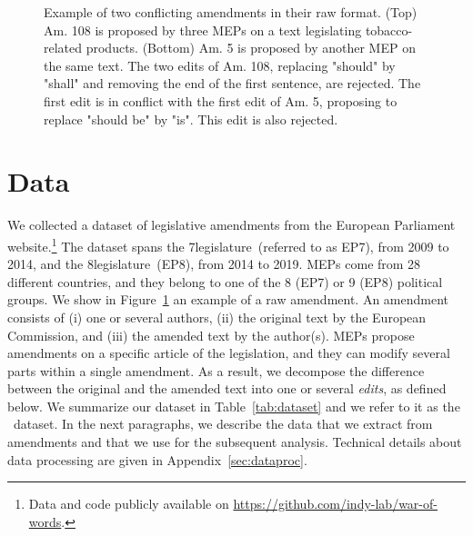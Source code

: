 \begin{figure}
	\newcommand{\imgscale}{0.5}
	{%
		\setlength{\fboxsep}{5.5pt}%
		\setlength{\fboxrule}{0.5pt}%
	}%
	\vfill
	\vspace{4pt}
	{%
		\setlength{\fboxsep}{5.5pt}%
		\setlength{\fboxrule}{0.5pt}%
	}%
	\caption{
		Example of two conflicting amendments in their raw format.
		(Top) Am. 108 is proposed by three MEPs on a text legislating tobacco-related products.
		(Bottom) Am. 5 is proposed by another MEP on the same text.
		The two edits of Am. 108, replacing "should" by "shall" and removing the end of the first sentence, are rejected.
		The first edit is in conflict with the first edit of Am. 5, proposing to replace "should be" by "is".
		This edit is also rejected.
	}
	\label{fig:amendment}
\end{figure}

\section{Data}
\label{sec:data}

We collected a dataset of  legislative amendments from the European Parliament website.\footnote{Data and code publicly available on \href{https://github.com/indy-lab/war-of-words}{https://github.com/indy-lab/war-of-words}.}
The dataset spans the 7\th legislature~(referred to as EP7), from 2009 to 2014, and the 8\th legislature~(EP8), from 2014 to 2019.
MEPs come from 28 different countries, and they belong to one of the 8 (EP7) or 9 (EP8) political groups.
We show in Figure~\ref{fig:amendment} an example of a raw amendment.
An amendment consists of (i) one or several authors, (ii) the original text by the European Commission, and (iii) the amended text by the author(s).
MEPs propose amendments on a specific article of the legislation, and they can modify several parts within a single amendment.
As a result, we decompose the difference between the original and the amended text into one or several \textit{edits}, as defined below.
We summarize our dataset in Table~\ref{tab:dataset} and we refer to it as the \warofwords\ dataset.
In the next paragraphs, we describe the data that we extract from amendments and that we use for the subsequent analysis.
Technical details about data processing are given in Appendix~\ref{sec:dataproc}.

